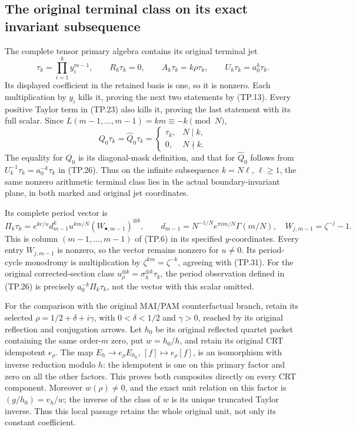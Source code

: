 \subsection{The original terminal class on its exact invariant subsequence}

The complete tensor primary algebra contains its original terminal
jet
\[
 \tau_k=\prod_{i=1}^k y_i^{m-1},\qquad
 R_k\tau_k=0,\qquad A_k\tau_k=k\rho\tau_k,\qquad
 U_k\tau_k=a_0^k\tau_k.
 \tag{TP.30}\label{eq:tp-terminal}
\]
Its displayed coefficient in the retained basis is one, so it is
nonzero. Each multiplication by \(y_i\) kills it, proving the next
two statements by (TP.13). Every positive Taylor term in (TP.23)
also kills it, proving the last statement with its full scalar.
Since \(L(m-1,\ldots,m-1)=km\equiv-k\pmod N\),
\[
 Q_0\tau_k=\widehat Q_0\tau_k
   =\begin{cases}\tau_k,&N\mid k,\\0,&N\nmid k.\end{cases}
 \tag{TP.31}\label{eq:tp-terminalprojector}
\]
The equality for \(Q_0\) is its diagonal-mask definition, and
that for \(\widehat Q_0\) follows from
\(U_k^{-1}\tau_k=a_0^{-k}\tau_k\) in (TP.26).
Thus on the infinite subsequence \(k=N\ell\), \(\ell\geq1\),
the same nonzero arithmetic terminal class lies in the actual
boundary-invariant plane, in both marked and original jet coordinates.

Its complete period vector is
\[
 \Pi_k\tau_k=e^{kc/u}d_{m-1}^k u^{km/N}
       (W_{\bullet,m-1})^{\otimes k},\qquad
 d_{m-1}=N^{-1/N}e^{\pi i m/N}\Gamma(m/N),\quad
 W_{j,m-1}=\zeta^{-j}-1.
 \tag{TP.32}\label{eq:tp-terminalperiod}
\]
This is column \((m-1,\ldots,m-1)\) of (TP.6) in its
specified \(y\)-coordinates. Every entry \(W_{j,m-1}\)
is nonzero, so the vector remains nonzero for \(u\ne0\).
Its period-cycle monodromy is multiplication by
\(\zeta^{km}=\zeta^{-k}\), agreeing with (TP.31).
For the original corrected-section class
\(u_\rho^{\otimes k}=\sigma_h^{\otimes k}\tau_k\), the
period observation defined in (TP.26) is precisely
\(a_0^{-k}\Pi_k\tau_k\), not the vector with this scalar omitted.

For the comparison with the original MAI/PAM counterfactual branch,
retain its selected \(\rho=1/2+\delta+i\gamma\), with
\(0<\delta<1/2\) and \(\gamma>0\), reached by its original
reflection and conjugation arrows. Let \(h_0\) be its original
reflected quartet packet containing the same order-\(m\) zero, put
\(w=h_0/h\), and retain its original CRT idempotent \(e_\rho\).
The map \(E_h\to e_\rho E_{h_0}\), \([f]\mapsto e_\rho[f]\),
is an isomorphism with inverse reduction modulo \(h\):
the idempotent is one on this primary factor and zero on all
the other factors. This proves both composites directly on
every CRT component. Moreover \(w(\rho)\ne0\), and the exact
unit relation on this factor is
\((g/h_0)=v_h/w\); the inverse of the class of \(w\) is its
unique truncated Taylor inverse. Thus this local passage retains
the whole original unit, not only its constant coefficient.

